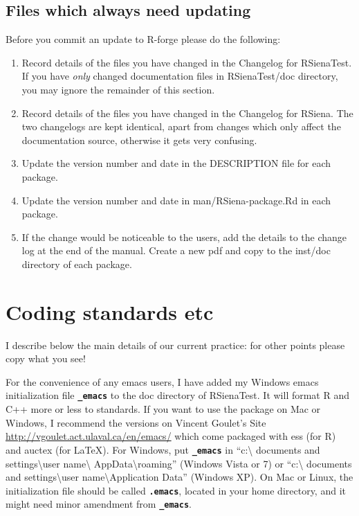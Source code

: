 \documentclass[12pt, a4paper]{article}
\renewcommand{\=}{\,=\,}
\newcommand{\+}{\,+\,}
\newcommand{\sfn}[1]{\textbf{\texttt{#1}}}
\begin{document}
\subsection{Files which always need updating}
 Before you commit an update to R-forge please do the following:
\begin{enumerate}
\item Record details of the files you have changed in the Changelog for
  RSienaTest. If you have \emph{only} changed documentation files in
  \textsf{RSienaTest/doc} directory, you may ignore the remainder of this
  section.
\item Record details of the files you have changed in the Changelog for RSiena.
  The two changelogs are kept identical, apart from changes which only affect
  the documentation source, otherwise it gets very confusing.
\item Update the version number and date in the \textsf{DESCRIPTION} file for
  each package.
\item Update the version number and date in \textsf{man/RSiena-package.Rd} in
  each package.
\item If the change would be noticeable to the users, add the details to the
  change log at the end of the manual. Create a new pdf and copy to the inst/doc
  directory of each package.
\end{enumerate}
\section{Coding standards etc}

I describe below the main details of our current practice: for other points
please copy what you see!

For the convenience of any emacs users, I have added my Windows emacs
initialization file \sfn{\_emacs} to the doc directory of RSienaTest. It will
format R and C++ more or less to standards. If you want to use the package on
Mac or Windows, I recommend the versions on Vincent Goulet's Site
\url{http://vgoulet.act.ulaval.ca/en/emacs/} which come packaged with ess (for
R) and auctex (for \LaTeX). For Windows, put \sfn{\_emacs} in ``c:\textbackslash
documents and settings\textbackslash user name\textbackslash
AppData\textbackslash roaming'' (Windows Vista or 7) or ``c:\textbackslash
documents and settings\textbackslash user name\textbackslash Application Data''
(Windows XP). On Mac or Linux, the initialization file should be called
\sfn{.emacs}, located in your home directory, and it might need minor amendment
from \sfn{\_emacs}.
\end{document}

